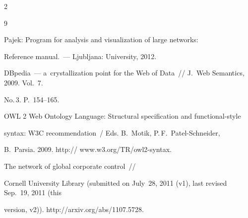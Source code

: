 \begin{multicols}{2}
{{\begin{thebibliography}{9}

 Pajek: Program for analysis and visualization of large networks: 

Reference manual.~--- Ljubljana: University,  2012.



DBpedia~--- a~crystallization point for the Web of Data~// J.~Web Semantics, 2009. Vol.~7. 

No.\,3. P.~154--165.


OWL 2 Web Ontology Language: Structural specification and functional-style 

syntax: W3C recommendation~/ Eds. B.~Motik, P.\,F.~Patel-Schneider, 

B.~Parsia. 2009. {\sf http:// www.w3.org/TR/owl2-syntax}. 



\label{end\stat}




 The network of global corporate control~// 

Cornell University Library (submitted on July~28, 2011 (v1), last revised  Sep.~19, 2011 (this 

version, v2)). {\sf http://arxiv.org/abs/1107.5728}.

\end{thebibliography}

} }



\end{multicols}

